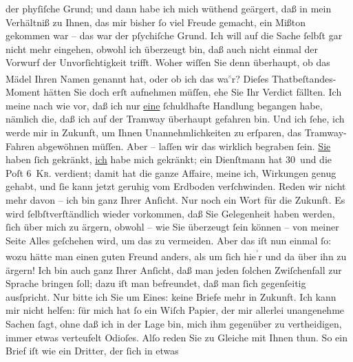 \begin{ledgroupsized}[t]{13cm}
               der phyſiſche Grund; und dann habe ich mich wüthend geärgert, daß in mein Verhältniß
               zu Ihnen, das mir bisher ſo viel Freude gemacht, ein Mißton gekommen war – das war
               der pſychiſche Grund. Ich will auf die Sache ſelbſt gar nicht mehr eingehen, obwohl
               ich überzeugt bin, daß auch nicht einmal der Vorwurf der Unvorſich{\pb}tigkeit trifft. Woher wiſſen Sie denn überhaupt, ob
               das Mädel Ihren Namen
               genannt hat, oder ob ich das wa\substVorne{}\textsuperscript{\textcolor{gray}{s}}\substDazwischen{}r\substHinten{}? Dieſes Thatbeſtandes-Moment hätten Sie doch erſt aufnehmen müſſen, ehe Sie
               Ihr Verdict fällten. Ich meine nach wie vor, daß ich nur \uline{eine} ſchuldhafte Handlung begangen habe, nämlich die, daß ich auf der
               Tramway überhaupt gefahren bin. Und ich ſehe, ich werde mir in Zukunft, um Ihnen
               Unannehmlichkeiten zu erſparen, das Tramway-Fahren abgewöhnen müſſen.\pend
           \pstart
           Aber – laſſen wir das wirklich begraben ſein. \uline{Sie}
               haben ſich gekränkt, \uline{ich} habe mich gekränkt; ein
               Dienſtmann hat 30 und die Poſt 6 \textsc{Kr.} verdient; damit hat
               die ganze Affaire, meine ich, Wirkungen genug gehabt, und ſie kann jetzt geruhig vom
               Erdboden verſchwinden. Reden wir nicht mehr davon – ich bin ganz Ihrer Anſicht.\pend
           \pstart
           Nur noch ein Wort für die Zukunft. Es wird ſelbſtverſtändlich wieder vorkommen, daß
               Sie Gelegenheit haben werden, ſich über mich zu ärgern, obwohl – wie Sie überzeugt
               ſein können – von meiner Seite Alles geſchehen wird, um das zu {\pb}vermeiden. Aber das iſt nun einmal ſo: wozu hätte
               man einen guten Freund anders, als um ſich hie\substVorne{}\textsuperscript{’}\substDazwischen{}r\substHinten{} und da über ihn zu ärgern! Ich bin auch ganz Ihrer Anſicht, daß man jeden
               ſolchen Zwiſchenfall zur Sprache bringen ſoll; dazu iſt man befreundet, daß man ſich
               gegenſeitig ausſpricht. Nur bitte ich Sie um Eines: keine Briefe mehr in Zukunft. Ich
               kann mir nicht \strikeout{\textcolor{gray}{hef}} helfen: ſür mich hat ſo ein Wiſch Papier, der mir  allerlei unangenehme Sachen ſagt, ohne daß ich in der Lage bin, mich ihm
               gegenüber zu vertheidigen, immer etwas verteufelt Odioſes. Alſo reden Sie zu\strikeout{\textcolor{gray}{r}} Gleiche mit Ihnen thun. So ein Brief iſt wie ein Dritter, der ſich in etwas

\end{ledgroupsized}
